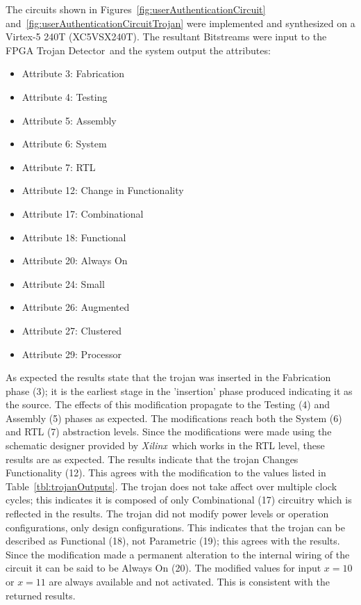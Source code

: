 \documentclass[conference]{IEEEtran}
\newcommand{\Xilinx}{\textit{\gls{Xilinx}}~}
\newcommand{\Name}{\acrshort{FPGA} Trojan Detector}
\newcommand{\NameNoPeriod}{\Name~}
\begin{document}
The circuits shown in Figures~\ref{fig:userAuthenticationCircuit} and~\ref{fig:userAuthenticationCircuitTrojan} were implemented and synthesized on a Virtex-5 240T  (XC5VSX240T).
The resultant \gls{Bitstream}s were input to the \NameNoPeriod and the system output the attributes:
\begin{itemize}
	\item Attribute 3: Fabrication
	\item Attribute 4: Testing
	\item Attribute 5: Assembly
	\item Attribute 6: System
	\item Attribute 7: RTL
	\item Attribute 12: Change in Functionality
	\item Attribute 17: Combinational
	\item Attribute 18: Functional
	\item Attribute 20: Always On
	\item Attribute 24: Small
	\item Attribute 26: Augmented
	\item Attribute 27: Clustered
	\item Attribute 29: Processor
\end{itemize}
As expected the results state that the trojan was inserted in the Fabrication phase (3); it is the earliest stage in the 'insertion' phase produced indicating it as the source.
The effects of this modification propagate to the Testing (4) and Assembly (5) phases as expected.
The modifications reach both the System (6) and \acrfull{RTL} (7) abstraction levels.
Since the modifications were made using the schematic designer provided by \Xilinx which works in the \acrshort{RTL} level, these results are as expected.
The results indicate that the trojan Changes Functionality (12). 
This agrees with the modification to the values listed in Table~\ref{tbl:trojanOutputs}.
The trojan does not take affect over multiple clock cycles; this indicates it is composed of only Combinational (17) circuitry which is reflected in the results.
The trojan did not modify power levels or operation configurations, only design configurations.
This indicates that the trojan can be described as Functional (18), not Parametric (19); this agrees with the results.
Since the modification made a permanent alteration to the internal wiring of the circuit it can be said to be Always On (20).
The modified values for input $x=10$ or $x=11$ are always available and not activated.
This is consistent with the returned results.
\end{document}

